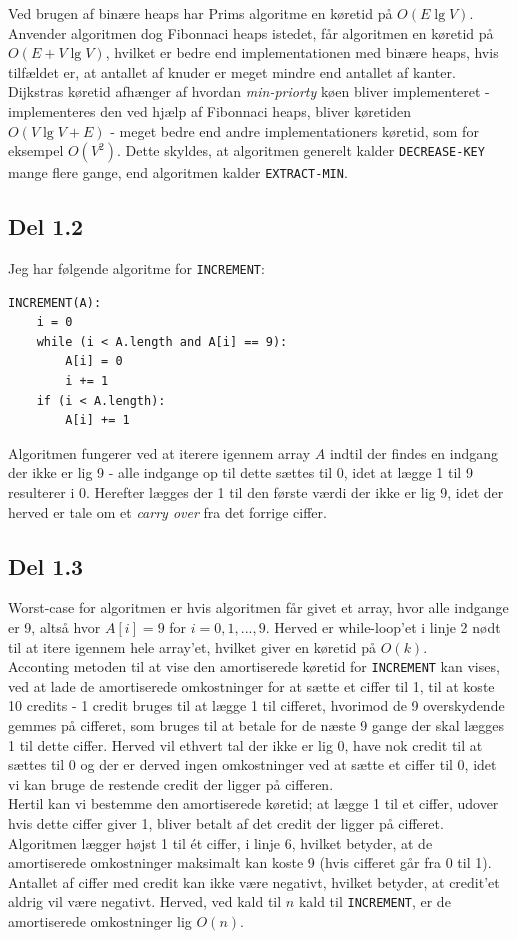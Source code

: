 \documentclass{report}
\begin{document}
Ved brugen af binære heaps har Prims algoritme en køretid på $O(E \lg V)$. Anvender algoritmen dog Fibonnaci heaps istedet, får algoritmen en køretid på $O(E + V \lg V)$, hvilket er bedre end implementationen med binære heaps, hvis tilfældet er, at antallet af knuder er meget mindre end antallet af kanter. \\
Dijkstras køretid afhænger af hvordan \textit{min-priorty} køen bliver implementeret - implementeres den ved hjælp af Fibonnaci heaps, bliver køretiden $O(V \lg V + E)$ - meget bedre end andre implementationers køretid, som for eksempel $O(V^2)$. Dette skyldes, at algoritmen generelt kalder \texttt{DECREASE-KEY} mange flere gange, end algoritmen kalder \texttt{EXTRACT-MIN}.

\newpage

\subsection*{Del 1.2}
Jeg har følgende algoritme for \texttt{INCREMENT}:
\begin{verbatim}
INCREMENT(A):
    i = 0
    while (i < A.length and A[i] == 9):
        A[i] = 0
        i += 1
    if (i < A.length):
        A[i] += 1
\end{verbatim}
Algoritmen fungerer ved at iterere igennem array $A$ indtil der findes en indgang der ikke er lig 9 - alle indgange op til dette sættes til 0, idet at lægge 1 til 9 resulterer i 0. Herefter lægges der 1 til den første værdi der ikke er lig 9, idet der herved er tale om et \textit{carry over} fra det forrige ciffer.

\newpage

\subsection*{Del 1.3}
Worst-case for algoritmen er hvis algoritmen får givet et array, hvor alle indgange er 9, altså hvor $A[i] = 9$ for $i = 0, 1, ..., 9$. Herved er while-loop'et i linje 2 nødt til at itere igennem hele array'et, hvilket giver en køretid på $O(k)$. \\
Acconting metoden til at vise den amortiserede køretid for \texttt{INCREMENT} kan vises, ved at lade de amortiserede omkostninger for at sætte et ciffer til 1, til at koste 10 credits - 1 credit bruges til at lægge 1 til cifferet, hvorimod de 9 overskydende gemmes på cifferet, som bruges til at betale for de næste 9 gange der skal lægges 1 til dette ciffer. Herved vil ethvert tal der ikke er lig 0, have nok credit til at sættes til 0 og der er derved ingen omkostninger ved at sætte et ciffer til 0, idet vi kan bruge de restende credit der ligger på cifferen. \\
Hertil kan vi bestemme den amortiserede køretid; at lægge 1 til et ciffer, udover hvis dette ciffer giver 1, bliver betalt af det credit der ligger på cifferet. Algoritmen lægger højst 1 til ét ciffer, i linje 6, hvilket betyder, at de amortiserede omkostninger maksimalt kan koste 9 (hvis cifferet går fra 0 til 1). Antallet af ciffer med credit kan ikke være negativt, hvilket betyder, at credit'et aldrig vil være negativt. Herved, ved kald til $n$ kald til \texttt{INCREMENT}, er de amortiserede omkostninger lig $O(n)$.
\end{document}
